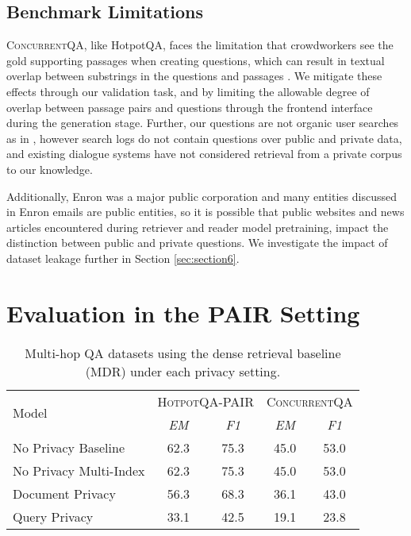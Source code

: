 \documentclass{article}
\renewcommand\cite{\citep}	\newcommand\shortcite{\citeyearpar}\newcommand\newcite{\citet}
\newcommand{\datasetname}{\textsc{ConcurrentQA}\xspace}
\newcommand{\problemshortname}{\textsc{PAIR}\xspace}
\begin{document}
\subsection{Benchmark Limitations}
\label{sec:limits_bench}
\datasetname, like HotpotQA, faces the limitation that crowdworkers see the gold supporting passages when creating questions, which can result in textual overlap between substrings in the questions and passages \cite{trivedi2020dire}. We mitigate these effects through our validation task, and by limiting the allowable degree of overlap between passage pairs and questions through the frontend interface during the generation stage. Further, our questions are not organic user searches as in \citet{47761}, however search logs do not contain questions over public and private data, and existing dialogue systems have not considered retrieval from a private corpus to our knowledge.


Additionally, Enron was a major public corporation and many entities discussed in Enron emails are public entities, so it is possible that public websites and news articles encountered during retriever and reader model pretraining, impact the distinction between public and private questions. We investigate the impact of dataset leakage further in Section \ref{sec:section6}. 
\section{Evaluation in the \problemshortname Setting}
\label{sec:solution}
\begin{table*}[t!]
        \begin{center}
    \normalsize
    \begin{tabular}{lcc|cc}
    \toprule
       \multirow{2}{*}{Model}  &      \multicolumn{2}{p{2.7cm}}{\centering \textsc{HotpotQA-\problemshortname}} &     \multicolumn{2}{p{2.7cm}}{\centering \datasetname}  \\
         &    \emph{EM}  &   \emph{F1}    & \emph{EM} & \emph{F1}\\

    \midrule
No Privacy Baseline         & 62.3 & 75.3 & 45.0 & 53.0  \\
     No Privacy Multi-Index      & 62.3 & 75.3 & 45.0 & 53.0 \\
     Document Privacy            & 56.3 & 68.3 & 36.1 & 43.0 \\
     Query Privacy               & 33.1 & 42.5 & 19.1 & 23.8\\
    \bottomrule
    \end{tabular}\normalsize
    \caption{Multi-hop QA datasets using the dense retrieval baseline (MDR) under each privacy setting.}
    \vspace{-2mm}
    \label{tab:benchmarks}
    \end{center}
\end{table*}
\end{document}
